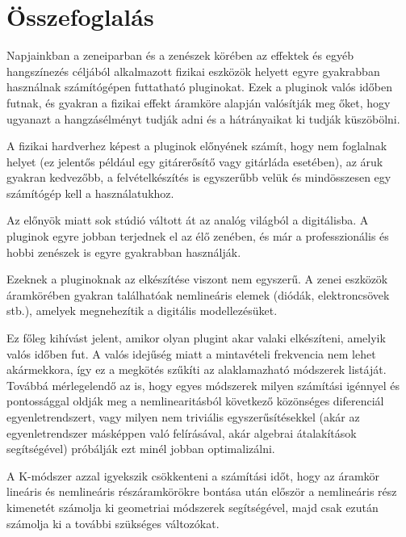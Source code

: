 \setcounter{page}{1}

\selecthungarian

\chapter*{Összefoglalás}

Napjainkban a zeneiparban és a zenészek körében az effektek és egyéb hangszínezés céljából alkalmazott fizikai eszközök helyett egyre gyakrabban
használnak számítógépen futtatható pluginokat. Ezek a pluginok valós időben futnak, és gyakran a fizikai effekt áramköre alapján
valósítják meg őket, hogy ugyanazt a hangzásélményt tudják adni és a hátrányaikat ki tudják küszöbölni.

A fizikai hardverhez képest a pluginok előnyének számít, hogy nem foglalnak helyet (ez jelentős például egy gitárerősítő vagy gitárláda esetében), az áruk
gyakran kedvezőbb, a felvételkészítés is egyszerűbb velük és mindösszesen egy számítógép kell a használatukhoz.

Az előnyök miatt sok stúdió váltott át az analóg világból a digitálisba. A pluginok egyre jobban terjednek el az élő zenében, és már a professzionális és hobbi 
zenészek is egyre gyakrabban használják.

Ezeknek a pluginoknak az elkészítése viszont nem egyszerű. A zenei eszközök áramkörében gyakran találhatóak nemlineáris elemek (diódák, elektroncsövek stb.), amelyek megnehezítik a 
digitális modellezésüket.

Ez főleg kihívást jelent, amikor olyan plugint akar valaki elkészíteni, amelyik valós időben fut. A valós idejűség miatt a mintavételi frekvencia nem lehet akármekkora, így ez a 
megkötés szűkíti az alaklamazható módszerek listáját. Továbbá mérlegelendő az is, hogy egyes módszerek milyen számítási igénnyel és pontossággal oldják meg a nemlinearitásból 
következő közönséges diferenciál egyenletrendszert, vagy milyen nem triviális egyszerűsítésekkel (akár az egyenletrendszer másképpen való felírásával, akár algebrai átalakítások 
segítségével) próbálják ezt minél jobban optimalizálni.

A K-módszer azzal igyekszik csökkenteni a számítási időt, hogy az áramkör lineáris és nemlineáris részáramkörökre bontása után először a nemlineáris rész kimenetét számolja ki 
geometriai módszerek segítségével, majd csak ezután számolja ki a további szükséges változókat.

